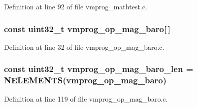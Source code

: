 \-Definition at line 92 of file vmprog\-\_\-mathtest.\-c.

\hypertarget{group___generic_i2_c_sensor_ga7f8283bd8d2bd7a50c0de34bc17e6e59}{
\subsubsection[{vmprog\-\_\-op\-\_\-mag\-\_\-baro}]{\setlength{\rightskip}{0pt plus 5cm}const uint32\-\_\-t {\bf vmprog\-\_\-op\-\_\-mag\-\_\-baro}\mbox{[}$\,$\mbox{]}}}\label{group___generic_i2_c_sensor_ga7f8283bd8d2bd7a50c0de34bc17e6e59}


\-Definition at line 32 of file vmprog\-\_\-op\-\_\-mag\-\_\-baro.\-c.

\hypertarget{group___generic_i2_c_sensor_gab041ee4d6bd39413440978233bbb8934}{
\subsubsection[{vmprog\-\_\-op\-\_\-mag\-\_\-baro\-\_\-len}]{\setlength{\rightskip}{0pt plus 5cm}const uint32\-\_\-t {\bf vmprog\-\_\-op\-\_\-mag\-\_\-baro\-\_\-len} = \-N\-E\-L\-E\-M\-E\-N\-T\-S({\bf vmprog\-\_\-op\-\_\-mag\-\_\-baro})}}\label{group___generic_i2_c_sensor_gab041ee4d6bd39413440978233bbb8934}


\-Definition at line 119 of file vmprog\-\_\-op\-\_\-mag\-\_\-baro.\-c.

